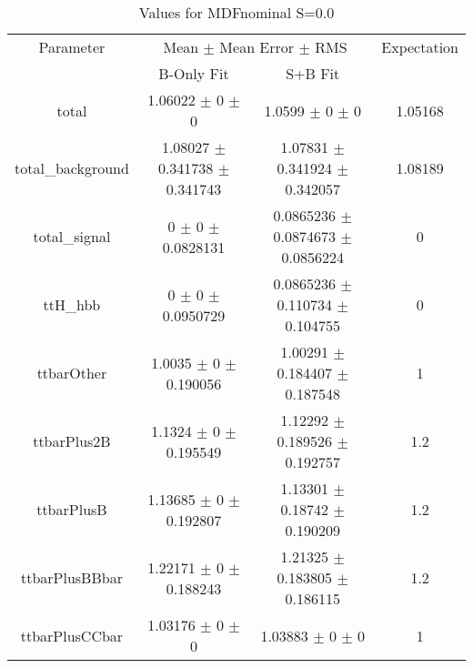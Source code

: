 \begin{table}
\centering
\caption{Values for MDFnominal S=0.0}
\begin{tabular}{cccc}
\toprule
Parameter & \multicolumn{2}{c}{Mean $\pm$ Mean Error $\pm$ RMS} & Expectation\\
 & B-Only Fit & S+B Fit & \\
\midrule
total & \num{1.06022} $\pm$ \num{0} $\pm$ \num{0} & \num{1.0599} $\pm$ \num{0} $\pm$ \num{0} & \num{1.05168}\\
total\_background & \num{1.08027} $\pm$ \num{0.341738} $\pm$ \num{0.341743} & \num{1.07831} $\pm$ \num{0.341924} $\pm$ \num{0.342057} & \num{1.08189}\\
total\_signal & \num{0} $\pm$ \num{0} $\pm$ \num{0.0828131} & \num{0.0865236} $\pm$ \num{0.0874673} $\pm$ \num{0.0856224} & \num{0}\\
ttH\_hbb & \num{0} $\pm$ \num{0} $\pm$ \num{0.0950729} & \num{0.0865236} $\pm$ \num{0.110734} $\pm$ \num{0.104755} & \num{0}\\
ttbarOther & \num{1.0035} $\pm$ \num{0} $\pm$ \num{0.190056} & \num{1.00291} $\pm$ \num{0.184407} $\pm$ \num{0.187548} & \num{1}\\
ttbarPlus2B & \num{1.1324} $\pm$ \num{0} $\pm$ \num{0.195549} & \num{1.12292} $\pm$ \num{0.189526} $\pm$ \num{0.192757} & \num{1.2}\\
ttbarPlusB & \num{1.13685} $\pm$ \num{0} $\pm$ \num{0.192807} & \num{1.13301} $\pm$ \num{0.18742} $\pm$ \num{0.190209} & \num{1.2}\\
ttbarPlusBBbar & \num{1.22171} $\pm$ \num{0} $\pm$ \num{0.188243} & \num{1.21325} $\pm$ \num{0.183805} $\pm$ \num{0.186115} & \num{1.2}\\
ttbarPlusCCbar & \num{1.03176} $\pm$ \num{0} $\pm$ \num{0} & \num{1.03883} $\pm$ \num{0} $\pm$ \num{0} & \num{1}\\
\bottomrule
\end{tabular}
\end{table}